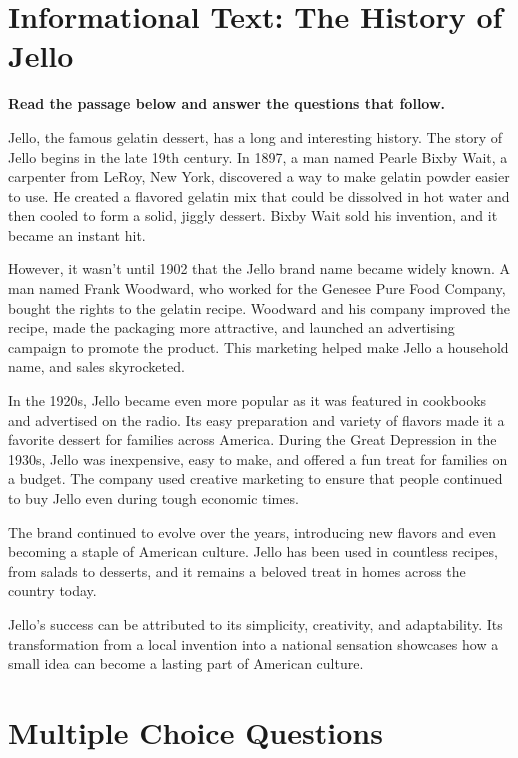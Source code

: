 \documentclass[12pt]{article}
\begin{document}
\onehalfspacing

\section*{Informational Text: The History of Jello}

\textbf{Read the passage below and answer the questions that follow.}

Jello, the famous gelatin dessert, has a long and interesting history. The story of Jello begins in the late 19th century. In 1897, a man named Pearle Bixby Wait, a carpenter from LeRoy, New York, discovered a way to make gelatin powder easier to use. He created a flavored gelatin mix that could be dissolved in hot water and then cooled to form a solid, jiggly dessert. Bixby Wait sold his invention, and it became an instant hit.

However, it wasn't until 1902 that the Jello brand name became widely known. A man named Frank Woodward, who worked for the Genesee Pure Food Company, bought the rights to the gelatin recipe. Woodward and his company improved the recipe, made the packaging more attractive, and launched an advertising campaign to promote the product. This marketing helped make Jello a household name, and sales skyrocketed.

In the 1920s, Jello became even more popular as it was featured in cookbooks and advertised on the radio. Its easy preparation and variety of flavors made it a favorite dessert for families across America. During the Great Depression in the 1930s, Jello was inexpensive, easy to make, and offered a fun treat for families on a budget. The company used creative marketing to ensure that people continued to buy Jello even during tough economic times.

The brand continued to evolve over the years, introducing new flavors and even becoming a staple of American culture. Jello has been used in countless recipes, from salads to desserts, and it remains a beloved treat in homes across the country today.

Jello’s success can be attributed to its simplicity, creativity, and adaptability. Its transformation from a local invention into a national sensation showcases how a small idea can become a lasting part of American culture.

\newpage

\section*{Multiple Choice Questions}
\end{document}
